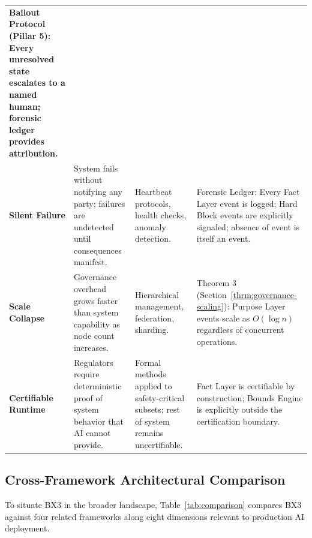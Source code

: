 \documentclass[12pt]{article}
\theoremstyle{plain}
\begin{document}
\begin{table}[htbp]
\begin{center}
\begin{tabular}{>{\bfseries}p{2.4cm} p{3.2cm} p{3.2cm} p{3.2cm}}
Bailout Protocol (Pillar 5): Every unresolved state escalates to a named human; forensic ledger provides attribution. \\
\addlinespace
Silent Failure & System fails without notifying any party; failures are undetected until consequences manifest. &
Heartbeat protocols, health checks, anomaly detection. &
Forensic Ledger: Every Fact Layer event is logged; Hard Block events are explicitly signaled; absence of event is itself an event. \\
\addlinespace
Scale Collapse & Governance overhead grows faster than system capability as node count increases. &
Hierarchical management, federation, sharding. &
Theorem 3 (Section~\ref{thrm:governance-scaling}): Purpose Layer events scale as $O(\log n)$ regardless of concurrent operations. \\
\addlinespace
Certifiable Runtime & Regulators require deterministic proof of system behavior that AI cannot provide. &
Formal methods applied to safety-critical subsets; rest of system remains uncertifiable. &
Fact Layer is certifiable by construction; Bounds Engine is explicitly outside the certification boundary. \\
\bottomrule
\end{tabular}
\end{center}
\end{table}

\subsection{Cross-Framework Architectural Comparison}

To situate BX3 in the broader landscape, Table~\ref{tab:comparison} compares BX3 against four related frameworks along eight dimensions relevant to production AI deployment.
\end{document}
